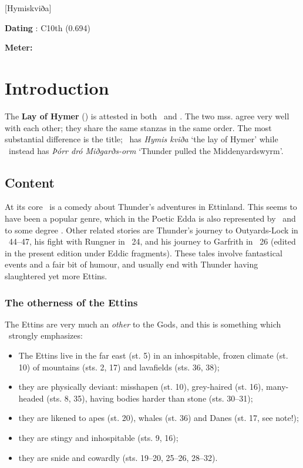 [Hymiskviða]

\begin{flushright}%
\textbf{Dating} \parencite{Sapp2022}: C10th (0.694)

\textbf{Meter:} \Fornyrdislag%
\end{flushright}%

\section{Introduction}

The \textbf{Lay of Hymer} (\Hymiskvida) is attested in both \Regius\ and \AM.  The two mss. agree very well with each other; they share the same stanzas in the same order.  The most substantial difference is the title; \AM\ has \emph{Hymis kviða} ‘the lay of Hymer’ while \Regius\ instead has \emph{Þórr dró Miðgarðs-orm} ‘Thunder pulled the Middenyardswyrm’.

\subsection{Content}

At its core \Hymiskvida\ is a comedy about Thunder’s adventures in Ettinland.  This seems to have been a popular genre, which in the Poetic Edda is also represented by \Thrymskvida\ and to some degree \Harbardsljod.  Other related stories are Thunder’s journey to Outyards-Lock in \Gylfaginning\ 44–47, his fight with Rungner in \Skaldskaparmal\ 24, and his journey to Garfrith in \Skaldskaparmal\ 26 (edited in the present edition under Eddic fragments).  These tales involve fantastical events and a fair bit of humour, and usually end with Thunder having slaughtered yet more Ettins.

\subsubsection{The otherness of the Ettins}

The Ettins are very much an \emph{other} to the Gods, and this is something which \Hymiskvida\ strongly emphasizes:

\begin{itemize}
  \item The Ettins live in the far east (st. 5) in an inhospitable, frozen climate (st. 10) of mountains (sts. 2, 17) and lavafields (sts. 36, 38);
  \item they are physically deviant: misshapen (st. 10), grey-haired (st. 16), many-headed (sts. 8, 35), having bodies harder than stone (sts. 30–31);
  \item they are likened to apes (st. 20), whales (st. 36) and Danes (st. 17, see note!);
  \item they are stingy and inhospitable (sts. 9, 16);
  \item they are snide and cowardly (sts. 19–20, 25–26, 28–32).
\end{itemize}

